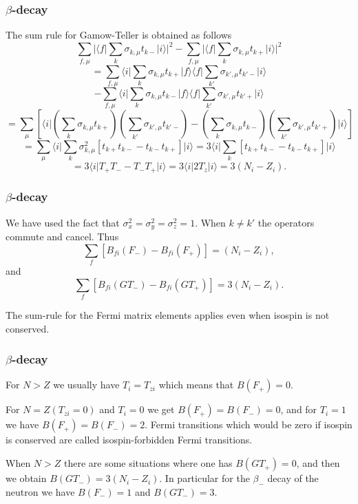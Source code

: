 \documentclass{beamer}
\begin{document}
\begin{frame}
\frametitle{$\beta$-decay}

\begin{block}{}
The sum rule for Gamow-Teller is obtained as follows
\[
\sum_{f,\mu}  \vert \langle f\vert  \sum_{k} \sigma_{k,\mu} t_{k-} \vert i\rangle\vert^{2}
- \sum_{f,\mu} \vert \langle f\vert  \sum_{k} \sigma_{k,\mu } t_{k+} \vert i\rangle\vert^{2}
\]
\[
= \sum_{f,\mu}\langle i\vert  \sum_{k} \sigma_{k,\mu} t_{k+} \vert f\rangle\langle f\vert  \sum_{k'} 
\sigma_{k',\mu} t_{k'-} \vert i\rangle
\]
\[
-  \sum_{f,\mu}
\langle i\vert  \sum_{k} \sigma_{k,\mu } t_{k-} \vert f\rangle\langle f\vert\sum_{k'} 
\sigma_{k',\mu } t_{k'+} \vert i\rangle
\]
\[
= \sum_{\mu} \left[\langle i\vert  \left(\sum _{k} \sigma_{k,\mu} t_{k+} \right)
    \left( \sum_{k'} \sigma_{k',\mu} t_{k'-}\right)
-   \left( \sum_{k} \sigma_{k,\mu} t_{k-} \right)
\left( \sum_{k'} \sigma_{k',\mu} t_{k'+} \right) \vert i\rangle
\right]
\]
\[
= \sum_{\mu }
\langle i\vert  \sum_{k}  \sigma ^{2}_{k,\mu } \left[ t_{k+} t_{k-} - t_{k-} t_{k+} \right] 
\vert i\rangle
= 3
\langle i\vert  \sum_{k} \left[ t_{k+} t_{k-} - t_{k-} t_{k+} \right] \vert i\rangle
\]
\[
=   3\langle i\vert  T_{+} T_{-} -  T_{-} T_{+}\vert i\rangle= 3\langle i\vert  2T_{z}\vert i\rangle  = 3(N_{i}-Z_{i}). 
\]
\end{block}
\end{frame}

\begin{frame}
\frametitle{$\beta$-decay}

\begin{block}{}
We have used the fact that $\sigma ^{2}_{x} = \sigma ^{2}_{y}=\sigma ^{2}_{z}=1$.
When $k \neq k'$ the operators commute and cancel.
Thus
\[
\sum_{f} \left[B_{fi}(F_{-}) - B_{fi}(F_{+}) \right] = (N_{i}-Z_{i}),       
\]
and
\[
\sum_{f} \left[ B_{fi}(GT_{-}) - B_{fi}(GT_{+}) \right] = 3(N_{i}-Z_{i}).       
\]

The sum-rule for the Fermi matrix elements applies even
when isospin is not conserved.
\end{block}
\end{frame}

\begin{frame}
\frametitle{$\beta$-decay}

\begin{block}{}
For $N > Z$ we usually have
$T_{i}=T_{zi}$ which means that $B(F_{+})=0$.

For $N=Z (T_{zi}=0)$ and $T_{i}=0$ we get 
$B(F_{+})=B(F_{-})=0$, and for $T_{i}=1$ we
have $B(F_{+}) = B(F_{-}) = 2$. Fermi transitions which would be zero
if isospin is conserved are called isospin-forbidden Fermi transitions.

When $N > Z$ there are some situations where one has $B(GT_{+})=0$,
and then we obtain $B(GT_{-}) = 3(N_{i}-Z_{i})$. In particular
for the $\beta_{-}$ decay of the neutron we have $B(F_{-})=1$
and $B(GT_{-})=3$.
\end{block}
\end{frame}
\end{document}
